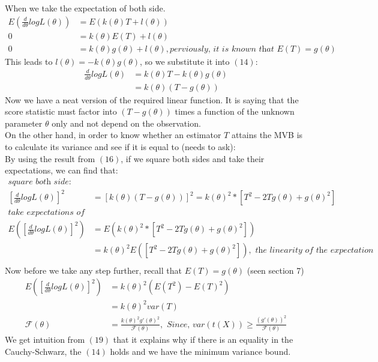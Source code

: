 \documentclass[12pt ]{article}
\begin{document}
When we take the expectation of both side.
\begin{equation*}
\begin{split}
E(\frac{d}{d\theta} logL(\theta)) &= E(k(\theta)T + l(\theta)) \\
0 &= k(\theta) E(T) + l(\theta) \\
0 &= k(\theta) g(\theta) + l(\theta), \textit{perviously, it is known that $E(T) = g(\theta)$}
\end{split}
\end{equation*}
This leads to $l(\theta) = - k(\theta) g(\theta)$, so we substitute it into $(14)$:
\begin{align}
\frac{d}{d\theta} logL(\theta) &= k(\theta)T - k(\theta) g(\theta) \\
&= k(\theta) (T - g(\theta))
\end{align}
Now we have a neat version of the required linear function. It is saying that the score statistic must factor into $(T - g(\theta))$ times a function of the unknown parameter $\theta$ only and not depend on the observation.  \\

On the other hand, in order to know whether an estimator $T$ attains the MVB is to calculate its variance and see if it is equal to (needs to ask): \\

By using the result from $(16)$, if we square both sides and take their expectations, we can find that: \\
\begin{equation*}
\begin{split}
\textit{square both side: }\\
[\frac{d}{d\theta} logL(\theta)]^2 &= [k(\theta) (T - g(\theta))]^2 = k(\theta)^2 * [T^2 - 2Tg(\theta) + g(\theta)^2] \\
\textit{take expectations of both side: }\\
E([\frac{d}{d\theta} logL(\theta)]^2) &= E(k(\theta)^2 * [T^2 - 2Tg(\theta) + g(\theta)^2]) \\
&= k(\theta)^2 E([T^2 - 2Tg(\theta) + g(\theta)^2]), \textit{   the linearity of the expectation} \\
\end{split}
\end{equation*}
\color{blue}
Now before we take any step further, recall that $E(T) = g(\theta)$ (seen section 7)
\color{black} \\
\begin{align} 
E([\frac{d}{d\theta} logL(\theta)]^2) &= k(\theta)^2 (E(T^2) - E(T)^2) \\
&= k(\theta)^2 var(T)\\
\mathcal{F}(\theta) &= \frac{k(\theta)^2 g'(\theta)^2}{\mathcal{F}(\theta)}, \textit{   Since, $var(t(X)) \geq \frac{(g'(\theta))^2}{\mathcal{F}(\theta)}$}
\end{align}
We get intuition from $(19)$ that it explains why if there is an equality in the Cauchy-Schwarz, the $(14)$ holds and we have the minimum variance bound.\\
\end{document}
